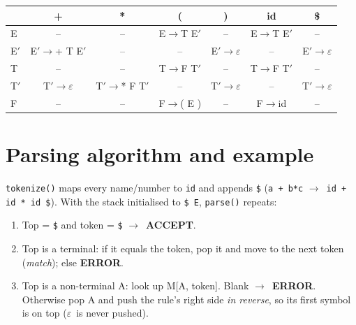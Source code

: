 \documentclass[10pt,a4paper]{article}
\newcommand{\eps}{$\varepsilon$}
\newcommand{\ar}{$\rightarrow$}
\newcommand{\tk}[1]{\texttt{#1}}
\begin{document}
\begin{center}
\small
\begin{tabular}{l*{6}{c}}
\toprule
 & + & * & ( & ) & id & \$ \\
\midrule
E    & -- & -- & E\ar T E$'$ & -- & E\ar T E$'$ & -- \\
E$'$ & E$'$\ar + T E$'$ & -- & -- & E$'$\ar \eps & -- & E$'$\ar \eps \\
T    & -- & -- & T\ar F T$'$ & -- & T\ar F T$'$ & -- \\
T$'$ & T$'$\ar \eps & T$'$\ar * F T$'$ & -- & T$'$\ar \eps & -- & T$'$\ar \eps \\
F    & -- & -- & F\ar ( E ) & -- & F\ar id & -- \\
\bottomrule
\end{tabular}
\end{center}

\section{Parsing algorithm and example}
\tk{tokenize()} maps every name/number to \tk{id} and appends \tk{\$} (\tk{a + b*c} \ar\ \tk{id + id * id \$}).
With the stack initialised to \tk{\$ E}, \tk{parse()} repeats:
\begin{enumerate}
\item Top = \tk{\$} and token = \tk{\$} \ar\ \textbf{ACCEPT}.
\item Top is a terminal: if it equals the token, pop it and move to the next token (\emph{match}); else \textbf{ERROR}.
\item Top is a non-terminal A: look up M[A, token]. Blank \ar\ \textbf{ERROR}. Otherwise pop A and push the
rule's right side \emph{in reverse}, so its first symbol is on top (\eps\ is never pushed).
\end{enumerate}
\end{document}

